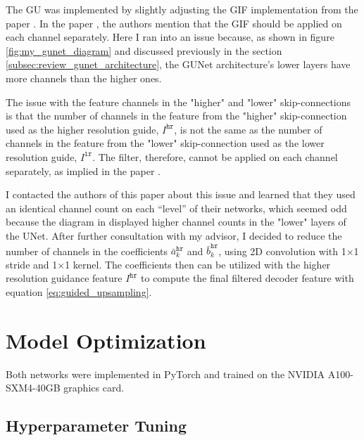 The \gls{GU} was implemented by slightly adjusting the \gls{GIF} implementation from the paper \cite{fastguidedtrainable}. In the paper \cite{gunet}, the authors mention that the \gls{GIF} should be applied on each channel separately. Here I ran into an issue because, as shown in figure \ref{fig:my_gunet_diagram} and discussed previously in the section \ref{subsec:review_gunet_architecture},  the \gls{GUNet} architecture's lower layers have more channels than the higher ones.

The issue with the feature channels in the "higher" and "lower" skip-connections is that the number of channels in the feature from the "higher" skip-connection used as the higher resolution guide, $I^\texttt{hr}$, is not the same as the number of channels in the feature from the "lower" skip-connection used as the lower resolution guide, $I^\texttt{lr}$. The filter, therefore, cannot be applied on each channel separately, as implied in the paper \cite{gunet}.

I contacted the authors of this paper about this issue and learned that they used an identical channel count on each ``level'' of their networks, which seemed odd because the diagram in \cite[fig. 2]{gunet} displayed higher channel counts in the "lower" layers of the UNet. After further consultation with my advisor, I decided to reduce the number of channels in the coefficients $\bar a_k^{\texttt{hr}}$ and $\bar b_k^{\texttt{hr}}$, using 2D convolution with 1×1 stride and 1×1 kernel. The coefficients then can be utilized with the higher resolution guidance feature $I^{\texttt{hr}}$ to compute the final filtered decoder feature with equation \ref{eq:guided_upsampling}.

\section{Model Optimization}

Both networks were implemented in PyTorch and trained on the NVIDIA A100-SXM4-40GB graphics card.

\subsection{Hyperparameter Tuning}
\label{subsec:hyperparameters}

